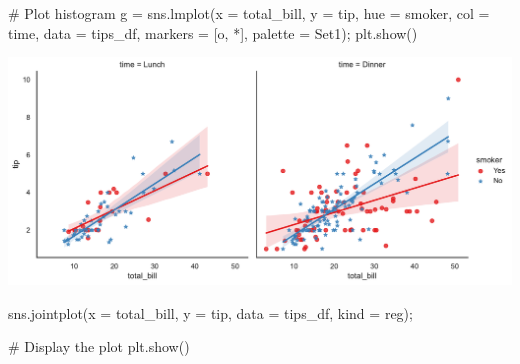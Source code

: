 \documentclass[
  letterpaper,
  DIV=11,
  numbers=noendperiod]{scrartcl}
\newenvironment{Shaded}{\begin{snugshade}}{\end{snugshade}}
\newcommand{\CommentTok}[1]{\textcolor[rgb]{0.37,0.37,0.37}{#1}}
\newcommand{\NormalTok}[1]{\textcolor[rgb]{0.00,0.46,0.62}{#1}}
\newcommand{\OperatorTok}[1]{\textcolor[rgb]{0.37,0.37,0.37}{#1}}
\newcommand{\StringTok}[1]{\textcolor[rgb]{0.13,0.47,0.30}{#1}}
\begin{document}
\begin{Shaded}
\begin{Highlighting}[]
\CommentTok{\# Plot histogram}
\NormalTok{g }\OperatorTok{=}\NormalTok{ sns.lmplot(x }\OperatorTok{=} \StringTok{\textquotesingle{}total\_bill\textquotesingle{}}\NormalTok{, }
\NormalTok{               y }\OperatorTok{=} \StringTok{\textquotesingle{}tip\textquotesingle{}}\NormalTok{, }
\NormalTok{               hue }\OperatorTok{=} \StringTok{\textquotesingle{}smoker\textquotesingle{}}\NormalTok{,}
\NormalTok{               col }\OperatorTok{=} \StringTok{\textquotesingle{}time\textquotesingle{}}\NormalTok{,}
\NormalTok{               data }\OperatorTok{=}\NormalTok{ tips\_df,}
\NormalTok{               markers }\OperatorTok{=}\NormalTok{ [}\StringTok{\textquotesingle{}o\textquotesingle{}}\NormalTok{, }\StringTok{\textquotesingle{}*\textquotesingle{}}\NormalTok{], }
\NormalTok{               palette }\OperatorTok{=} \StringTok{\textquotesingle{}Set1\textquotesingle{}}\NormalTok{)}\OperatorTok{;}
\NormalTok{plt.show()}
\end{Highlighting}
\end{Shaded}

\includegraphics{data_visualization_with_seaborn_files/figure-pdf/cell-22-output-1.pdf}

\begin{Shaded}
\begin{Highlighting}[]
\NormalTok{sns.jointplot(x }\OperatorTok{=} \StringTok{\textquotesingle{}total\_bill\textquotesingle{}}\NormalTok{, }
\NormalTok{              y }\OperatorTok{=} \StringTok{\textquotesingle{}tip\textquotesingle{}}\NormalTok{, }
\NormalTok{              data }\OperatorTok{=}\NormalTok{ tips\_df, }
\NormalTok{              kind }\OperatorTok{=} \StringTok{\textquotesingle{}reg\textquotesingle{}}\NormalTok{)}\OperatorTok{;}
              
\CommentTok{\# Display the plot}
\NormalTok{plt.show()}
\end{Highlighting}
\end{Shaded}
\end{document}
